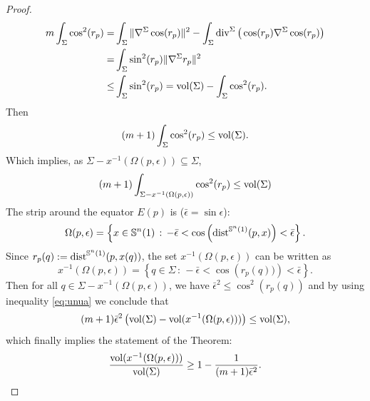 \documentclass[11pt,letterpaper]{amsart}
\theoremstyle{definition}
\theoremstyle{remark}
\newcommand{\Div}{\operatorname{div}}
\begin{document}
\begin{proof}
\begin{equation}\label{eq:longa}
    \begin{aligned}
m\int_\Sigma\cos^2(r_p)=&\int_\Sigma\Vert \nabla^{\Sigma}  \cos(r_p)\Vert^2-\int_\Sigma \Div^\Sigma\big(\cos(r_p)\nabla^\Sigma \cos(r_p)\big)\\
=&\int_\Sigma \sin^2(r_p)\Vert \nabla^{\Sigma} r_p\Vert^2\\\leq& \int_\Sigma \sin^2(r_p)
={\rm vol}(\Sigma)- \int_\Sigma \cos^2(r_p).
\end{aligned}
\end{equation}
Then
\begin{equation}\label{eq:nula}
(m+1)\int_\Sigma \cos^2(r_p)\leq {\rm vol}(\Sigma).    
\end{equation}
Which implies, as  $\Sigma-x^{-1}(\Omega(p,\epsilon)) \subseteq \Sigma$,
\begin{equation}\label{eq:unua}
(m+1)\int_{\Sigma-x^{-1}(\Omega(p,\epsilon))} \cos^2(r_p)\leq {\rm vol}(\Sigma)    
\end{equation}
The strip around the equator $E(p)$ is ($\bar \epsilon=\sin \epsilon$):
$$
\Omega(p,\epsilon) =\left\lbrace x\in \mathbb{S}^{n}(1)\, : \, -\bar \epsilon<\cos\left({\rm dist}^{\mathbb{S}^{n}(1)}(p,x)\right)<\bar \epsilon\right\rbrace.
$$
Since $r_p(q):={\rm dist}^{\mathbb{S}^{n}(1)}(p,x(q))$, the set $x^{-1}(\Omega(p,\epsilon))$ can be written as 
$$
x^{-1}(\Omega(p,\epsilon))=\left\lbrace q \in \Sigma\,:\, -\bar \epsilon<\cos\left(r_p(q))\right)<\bar \epsilon\right\rbrace.
$$ Then for all $q \in\Sigma-x^{-1}(\Omega(p,\epsilon))$, we have
$ \bar\epsilon^2 \leq \cos^2(r_p(q))$  and by using inequality \eqref{eq:unua} we conclude that
 $$
(m+1)\bar \epsilon^2\left({\rm vol}(\Sigma)-{\rm vol}(x^{-1}(\Omega(p,\epsilon)))\right)\leq {\rm vol}(\Sigma),
$$ which finally implies the statement of the Theorem:
$$
\frac{{\rm vol}(x^{-1}(\Omega(p,\epsilon)))}{{\rm vol}(\Sigma)}\geq 1-\frac{1}{(m+1)\bar\epsilon^2}.
$$\end{proof}
\end{document}
